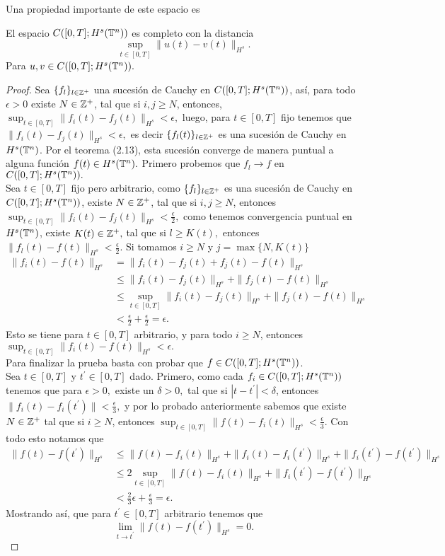 Una propiedad importante de este espacio es
\begin{prop}\label{completezC}
    El espacio $C([0,T];H^s(\mathbb{T}^n))$ es completo con la distancia
    $$\sup_{t\in[0,T]}\|u(t)-v(t)\|_{H^s}.$$
    Para $u,v\in C([0,T];H^s(\mathbb{T}^n)).$
\end{prop}
\begin{proof}
    Sea $\{f_l\}_{l\in\mathbb{Z}^+}$ una sucesión de Cauchy en $C([0,T];H^s(\mathbb{T}^n))$, así, para todo $\epsilon>0$ existe $N\in\mathbb{Z}^+$, tal que si $i,j\geq N$,  entonces, $\sup_{t\in[0,T]}\|f_i(t)-f_j(t)\|_{H^s}<\epsilon,$ luego, para $t\in[0,T]$ fijo tenemos que $\|f_i(t)-f_j(t)\|_{H^s}<\epsilon,$ es decir $\{f_l(t)\}_{l\in\mathbb{Z}^+}$ es una sucesión de Cauchy en $H^s(\mathbb{T}^n)$. Por el teorema (2.13), esta sucesión converge de manera puntual a alguna función $f(t)\in H^s(\mathbb{T}^n).$ Primero probemos que $f_l\to f$ en $C([0,T];H^s(\mathbb{T}^n)).$\\

    Sea $t\in[0,T]$ fijo pero arbitrario, como $\{f_l\}_{l\in\mathbb{Z}^+}$ es una sucesión de Cauchy en $C([0,T];H^s(\mathbb{T}^n))$, existe $N\in\mathbb{Z}^+$, tal que si $i,j\geq N$, entonces $\sup_{t\in[0,T]}\|f_i(t)-f_j(t)\|_{H^s}<\frac{\epsilon}{2},$ como tenemos convergencia puntual en $H^s(\mathbb{T}^n)$, existe $K(t)\in\mathbb{Z}^+,$ tal que si $l\geq K(t),$ entonces $\|f_l(t)-f(t)\|_{H^s}<\frac{\epsilon}{2}.$ Si tomamos $i\geq N$ y $j=\max\{N,K(t)\}$ 
    \begin{align*}
        \|f_i(t)-f(t)\|_{H^s}&=\|f_i(t)-f_j(t)+f_j(t)-f(t)\|_{H^s}\\
        &\leq\|f_i(t)-f_j(t)\|_{H^s}+\|f_j(t)-f(t)\|_{H^s}\\
        &\leq\sup_{t\in[0,T]}\|f_i(t)-f_j(t)\|_{H^s}+\|f_j(t)-f(t)\|_{H^s}\\
        &<\frac{\epsilon}{2}+\frac{\epsilon}{2}=\epsilon.
    \end{align*}
    Esto se tiene para $t\in[0,T]$ arbitrario, y para todo $i\geq N$, entonces $\sup_{t\in[0,T]}\|f_i(t)-f(t)\|_{H^s}<\epsilon.$\\

    Para finalizar la prueba basta con probar que $f\in C([0,T];H^s(\mathbb{T}^n))$.\\ 

    Sea $t\in[0,T]$ y $t^\prime\in[0,T]$ dado. Primero, como cada $f_i\in C([0,T];H^s(\mathbb{T}^n))$ tenemos que para $\epsilon>0,$ existe un $\delta>0,$ tal que si $|t-t^\prime|<\delta$, entonces $\|f_i(t)-f_i(t^\prime)\|<\frac{\epsilon}{3},$ y por lo probado anteriormente sabemos que existe $N\in\mathbb{Z}^+$ tal que si $i\geq N$, entonces $\sup_{t\in[0,T]}\|f(t)-f_i(t)\|_{H^s}<\frac{\epsilon}{3}.$ Con todo esto notamos que
    \begin{align*}
        \|f(t)-f(t^\prime)\|_{H^s}&\leq\|f(t)-f_i(t)\|_{H^s}+\|f_i(t)-f_i(t^\prime)\|_{H^s}+\|f_i(t^\prime)-f(t^\prime)\|_{H^s}\\
        &\leq 2\sup_{t\in[0,T]}\|f(t)-f_i(t)\|_{H^s}+\|f_i(t^\prime)-f(t^\prime)\|_{H^s}\\
        &<\frac{2}{3}\epsilon+\frac{\epsilon}{3}=\epsilon.
    \end{align*}
    Mostrando así, que para $t^\prime\in[0,T]$ arbitrario tenemos que
    $$\lim_{t\to t^\prime}\|f(t)-f(t^\prime)\|_{H^s}=0.$$
\end{proof}
